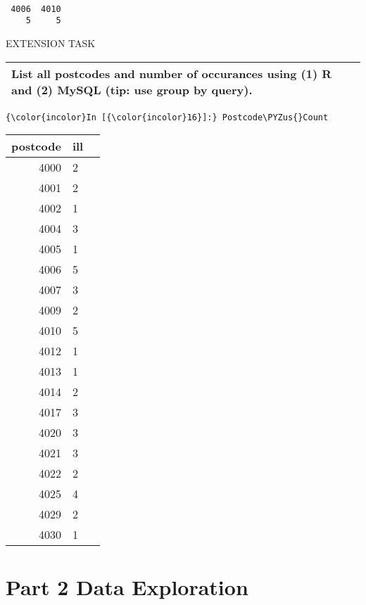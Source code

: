 \documentclass[11pt]{article}
\def\PYZus{\char`\_}
\begin{document}
    
    
    \begin{verbatim}

 4006  4010 
    5     5 
    \end{verbatim}

    
    \textbar{}

EXTENSION TASK

\begin{longtable}[]{@{}l@{}}
\toprule
\begin{minipage}[t]{0.07\columnwidth}\raggedright\strut
List all postcodes and number of occurances using (1) R and (2) MySQL
(tip: use group by query).\strut
\end{minipage}\tabularnewline
\bottomrule
\end{longtable}

    \begin{Verbatim}[commandchars=\\\{\}]
{\color{incolor}In [{\color{incolor}16}]:} Postcode\PYZus{}Count
\end{Verbatim}


    \begin{tabular}{r|ll}
 postcode & ill\\
\hline
	  4000 & 2    \\
	  4001 & 2    \\
	  4002 & 1    \\
	  4004 & 3    \\
	  4005 & 1    \\
	  4006 & 5    \\
	  4007 & 3    \\
	  4009 & 2    \\
	  4010 & 5    \\
	  4012 & 1    \\
	  4013 & 1    \\
	  4014 & 2    \\
	  4017 & 3    \\
	  4020 & 3    \\
	  4021 & 3    \\
	  4022 & 2    \\
	  4025 & 4    \\
	  4029 & 2    \\
	  4030 & 1    \\
\end{tabular}


    
    \section{Part 2 Data Exploration}\label{part-2-data-exploration}
\end{document}
